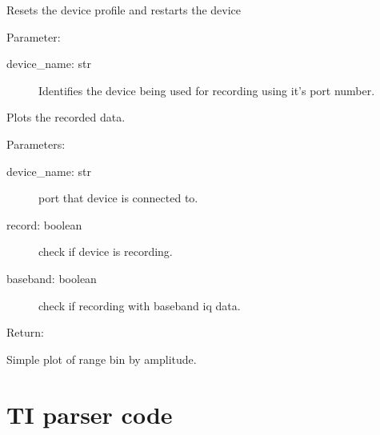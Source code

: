\documentclass[letterpaper,10pt,english]{sphinxmanual}
\begin{document}

\begin{fulllineitems}
\label{\detokenize{X4 radar:X4_record_playback.reset}}
Resets the device profile and restarts the device

Parameter:
\begin{description}
\item[{device\_name: str}] \leavevmode
Identifies the device being used for recording using it’s port number.

\end{description}

\end{fulllineitems}


\begin{fulllineitems}
\label{\detokenize{X4 radar:X4_record_playback.simple_xep_plot}}
Plots the recorded data.

Parameters:
\begin{description}
\item[{device\_name: str}] \leavevmode
port that device is connected to.

\item[{record: boolean}] \leavevmode
check if device is recording.

\item[{baseband: boolean}] \leavevmode
check if recording with baseband iq data.

\end{description}

Return:

Simple plot of range bin by amplitude.

\end{fulllineitems}



\section{TI parser code}
\label{\detokenize{TI radar:module-TI_parser}}\label{\detokenize{TI radar:ti-parser-code}}\label{\detokenize{TI radar::doc}}
\end{document}
